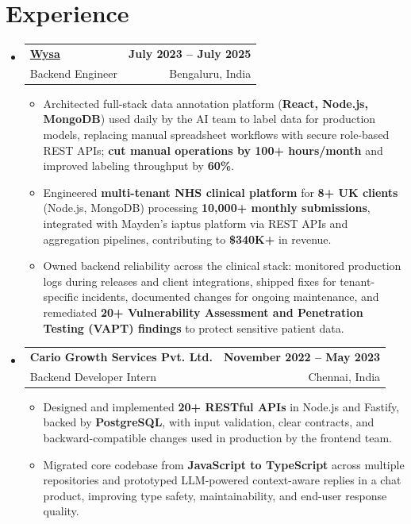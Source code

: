 \documentclass[letterpaper,10pt]{article}
\makeatletter
\newcommand{\resumeItem}[1]{
  \item\small{#1\vspace{-1pt}}
}
\newcommand{\resumeSubheading}[4]{
  \vspace{1pt}\item
    \begin{tabular*}{0.985\textwidth}[t]{l@{\extracolsep{\fill}}r}
      \textbf{#1} & \textbf{\small #2} \\
      {\small\color{ResumeSlate} #3} & {\small\color{ResumeSlate} #4} \\
    \end{tabular*}\vspace{-6pt}
}
\newcommand{\resumeSubHeadingListStart}{\begin{itemize}[leftmargin=0.0in, label={}, itemsep=2pt, topsep=2pt]}
\newcommand{\resumeSubHeadingListEnd}{\end{itemize}}
\newcommand{\resumeItemListStart}{\begin{itemize}[leftmargin=0.18in, itemsep=2pt, topsep=1pt]}
\newcommand{\resumeItemListEnd}{\end{itemize}\vspace{-4pt}}
\makeatother
\begin{document}
\section{Experience}
\resumeSubHeadingListStart
  \resumeSubheading
    {\href{https://www.wysa.io}{Wysa}}{July 2023 -- July 2025}
    {Backend Engineer}{Bengaluru, India}
    \resumeItemListStart
      \resumeItem{Architected full-stack data annotation platform (\textbf{React, Node.js, MongoDB}) used daily by the AI team to label data for production models, replacing manual spreadsheet workflows with secure role-based REST APIs; \textbf{cut manual operations by 100+ hours/month} and improved labeling throughput by \textbf{60\%}.}
      \resumeItem{Engineered \textbf{multi-tenant NHS clinical platform} for \textbf{8+ UK clients} (Node.js, MongoDB) processing \textbf{10{,}000+ monthly submissions}, integrated with Mayden's iaptus platform via REST APIs and aggregation pipelines, contributing to \textbf{\$340K+} in revenue.}
      \resumeItem{Owned backend reliability across the clinical stack: monitored production logs during releases and client integrations, shipped fixes for tenant-specific incidents, documented changes for ongoing maintenance, and remediated \textbf{20+ Vulnerability Assessment and Penetration Testing (VAPT) findings} to protect sensitive patient data.}
    \resumeItemListEnd
  \resumeSubheading
    {Cario Growth Services Pvt. Ltd.}{November 2022 -- May 2023}
    {Backend Developer Intern}{Chennai, India}
    \resumeItemListStart
      \resumeItem{Designed and implemented \textbf{20+ RESTful APIs} in Node.js and Fastify, backed by \textbf{PostgreSQL}, with input validation, clear contracts, and backward-compatible changes used in production by the frontend team.}
      \resumeItem{Migrated core codebase from \textbf{JavaScript to TypeScript} across multiple repositories and prototyped LLM-powered context-aware replies in a chat product, improving type safety, maintainability, and end-user response quality.}
    \resumeItemListEnd
\resumeSubHeadingListEnd
\vspace{-4pt}
\end{document}
